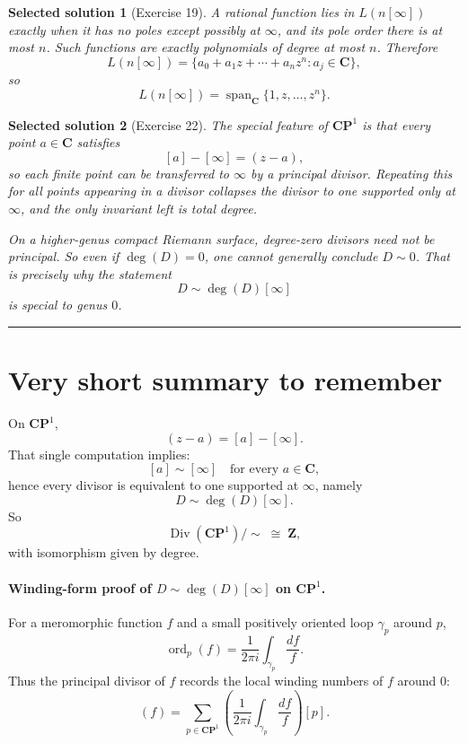 \documentclass[11pt]{article}
\newtheorem*{solution}{Selected solution}
\newcommand{\CP}{\mathbf{CP}^1}
\newcommand{\C}{\mathbf{C}}
\newcommand{\Div}{\operatorname{Div}}
\begin{document}
	\begin{solution}[Exercise 19]
		A rational function lies in \(L(n[\infty])\) exactly when it has no poles except possibly at \(\infty\), and its pole order there is at most \(n\). Such functions are exactly polynomials of degree at most \(n\). Therefore
		\[
		L(n[\infty])=\{a_0+a_1z+\cdots+a_n z^n : a_j\in\C\},
		\]
		so
		\[
		L(n[\infty])=\operatorname{span}_{\C}\{1,z,\dots,z^n\}.
		\]
	\end{solution}
	
	\begin{solution}[Exercise 22]
		The special feature of \(\CP\) is that every point \(a\in\C\) satisfies
		\[
		[a]-[\infty]=(z-a),
		\]
		so each finite point can be transferred to \(\infty\) by a principal divisor. Repeating this for all points appearing in a divisor collapses the divisor to one supported only at \(\infty\), and the only invariant left is total degree.
		
		On a higher-genus compact Riemann surface, degree-zero divisors need not be principal. So even if \(\deg(D)=0\), one cannot generally conclude \(D\sim 0\). That is precisely why the statement
		\[
		D\sim \deg(D)[\infty]
		\]
		is special to genus \(0\).
	\end{solution}
	
	\hrule
	\bigskip
	
	\section*{Very short summary to remember}
	
	On \(\CP\),
	\[
	(z-a)=[a]-[\infty].
	\]
	That single computation implies:
	\[
	[a]\sim [\infty] \quad \text{for every } a\in\C,
	\]
	hence every divisor is equivalent to one supported at \(\infty\), namely
	\[
	D\sim \deg(D)[\infty].
	\]
	So
	\[
	\Div(\CP)/\sim \;\cong\; \mathbf{Z},
	\]
	with isomorphism given by degree.
	
	\newpage
	\paragraph{Winding-form proof of $D\sim \deg(D)[\infty]$ on $\mathbf{CP}^1$.}
	For a meromorphic function $f$ and a small positively oriented loop $\gamma_p$ around $p$,
	\[
	\operatorname{ord}_p(f)=\frac{1}{2\pi i}\int_{\gamma_p}\frac{df}{f}.
	\]
	Thus the principal divisor of $f$ records the local winding numbers of $f$ around $0$:
	\[
	(f)=\sum_{p\in \mathbf{CP}^1}\left(\frac{1}{2\pi i}\int_{\gamma_p}\frac{df}{f}\right)[p].
	\]
	
\end{document}
